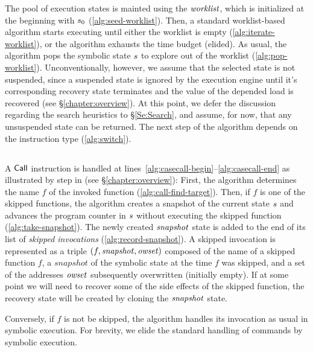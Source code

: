 The pool of execution states is mainted using the $\mathit{worklist}$,
which is initialized at the beginning with $s_0$ (\cref{alg:seed-worklist}).
Then, a standard worklist-based algorithm starts executing until either the
worklist is empty (\cref{alg:iterate-worklist}), or the algorithm
exhausts the time budget (elided). As usual, the algorithm pops the
symbolic state $s$ to explore out of the worklist
(\cref{alg:pop-worklist}).
Unconventionally, however, we assume that
the selected state is not suspended, since a suspended state is ignored by the execution engine
until it's corresponding recovery state terminates
and the value of the depended load is recovered (see \S\ref{chapter:overview}).
At this point, we defer the discussion regarding the search heuristics to \S\ref{Se:Search},
and assume, for now, that any unsuspended state can be returned.
The next step of the algorithm depends on the instruction type (\cref{alg:switch}).

\subsection{}
A $\mathsf{Call}$ instruction is handled at lines~\ref{alg:casecall-begin}--\ref{alg:casecall-end} as illustrated by step
 in  (see \S\ref{chapter:overview}):
First, the algorithm determines the name $f$ of the invoked function
(\cref{alg:call-find-target}). Then, if $f$ is one of the skipped
functions, the algorithm creates a snapshot of the current state
$s$ and advances the program counter in $s$
without executing the skipped function (\cref{alg:take-snapshot}).
The newly created $\mathit{snapshot}$ state is added to the end of its list 
of \emph{skipped invocations} (\cref{alg:record-snapshot}).
A skipped invocation is represented
as a triple $(f,\mathit{snapshot},\mathit{owset})$ composed of the name of a skipped
function $f$, a $snapshot$ of the symbolic state at the time $f$ was
skipped, and a set of the addresses $\mathit{owset}$ subsequently overwritten
(initially empty).
If at some point we will need to recover some of the side effects
of the skipped function, the recovery state will be created
by cloning the $\mathit{snapshot}$ state.

Conversely, if $f$ is not be skipped, the algorithm handles its
invocation as usual in symbolic execution.  For brevity, we elide the
standard handling of commands by symbolic execution.

